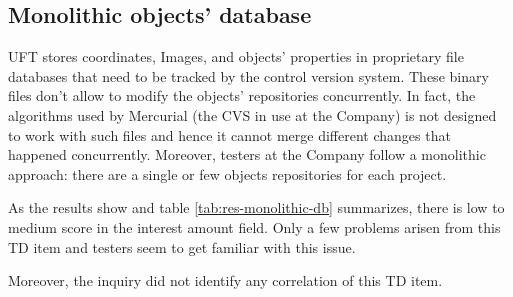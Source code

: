 	\subsection{Monolithic objects' database}

	UFT stores coordinates, Images, and objects' properties in proprietary file databases that need to be tracked by the control version system. These binary files don't allow to modify the objects' repositories concurrently. In fact, the algorithms used by Mercurial (the CVS in use at the Company) is not designed to work with such files and hence it cannot merge different changes that happened concurrently. Moreover, testers at the Company follow a monolithic approach: there are a single or few objects repositories for each project.

     \label{}
    As the results  show and table \ref{tab:res-monolithic-db} summarizes, there is low to medium score in the interest amount field. Only a few problems arisen from this TD item and testers seem to get familiar with this issue.

    Moreover, the inquiry did not identify any correlation of this TD item.

